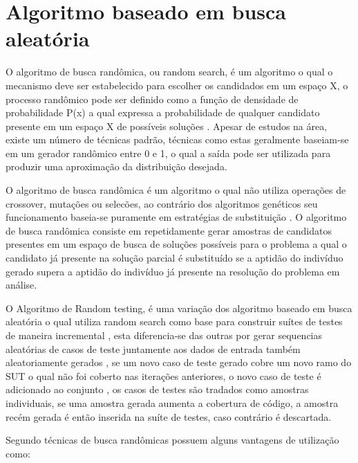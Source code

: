 \documentclass[
	12pt,				%
	oneside,			%
	a4paper,			%
	english,			%
	brazil				%
	]{abntex2ppgsi}
\begin{document}
\section{Algoritmo baseado em busca aleatória}

O algoritmo de busca randômica, ou random search,  é um algoritmo o qual o mecanismo deve ser estabelecido para escolher os candidados em um espaço X, o processo randômico pode ser definido como a função de densidade de probabilidade P(x) a qual expressa a probabilidade de qualquer candidato presente em um espaço X de possíveis soluções \cite{Karnopp63}. Apesar de estudos na área, existe um número de técnicas padrão, técnicas como estas geralmente baseiam-se em um gerador randômico entre 0 e 1, o qual a saída pode ser utilizada para produzir uma aproximação da distribuição desejada. \cite{Karnopp63}

O algoritmo de busca randômica é um algoritmo o qual não utiliza operações de crossover, mutações ou selecões, ao contrário dos algoritmos genéticos seu funcionamento baseia-se puramente em estratégias de substituição \cite{Campos2017}. O algoritmo de busca randômica consiste em repetidamente gerar amostras de candidatos presentes em um espaço de busca de soluções possíveis para o problema a qual o candidato já presente na solução parcial é substituído se a aptidão do indivíduo gerado supera a aptidão do indivíduo já presente na resolução do problema em análise. \cite{Campos2017}

O Algoritmo de Random testing, é uma variação dos algoritmo baseado em busca aleatória o qual utiliza random search como base para construir suítes de testes de maneira incremental \cite{Campos2017} , esta diferencia-se das outras por gerar sequencias aleatórias de casos de teste juntamente aos dados de entrada também  aleatoriamente gerados \cite{shamriski20151115}, se um novo caso de teste gerado cobre um novo ramo do SUT o qual não foi coberto nas iterações anteriores, o novo caso de teste é adicionado ao conjunto  \cite{shamriski20151115}, os casos de testes são tradados como amostras individuais, se uma amostra gerada aumenta a cobertura de código, a amostra recém gerada é então inserida na suíte de testes, caso contrário é descartada. \cite{Campos2017}

Segundo \cite{Karnopp63} técnicas de busca randômicas possuem alguns vantagens de utilização como:
\end{document}
